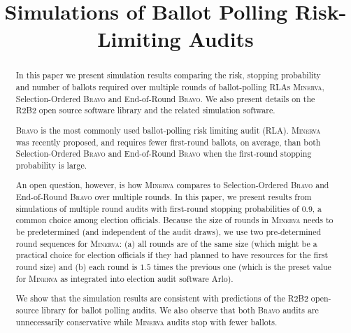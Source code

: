 \documentclass[runningheads]{llncs}
\newcommand{\Minerva}{\textsc{Minerva}\xspace}
\newcommand{\BRAVO}{\textsc{Bravo}\xspace}
\begin{document}
%
\title{Simulations of Ballot Polling Risk-Limiting Audits}
%
%

\maketitle              %
%
\begin{abstract}
    In this paper we present simulation results comparing the risk, stopping probability and number of ballots required over multiple rounds of ballot-polling RLAs \Minerva, Selection-Ordered \BRAVO and End-of-Round \BRAVO. We also
    present details on the R2B2 open source software library and the related simulation software.    
    
    \BRAVO is the most commonly used ballot-polling risk limiting audit (RLA). \Minerva was recently proposed, and requires fewer first-round ballots, on average, than both Selection-Ordered \BRAVO and End-of-Round \BRAVO when the first-round stopping probability is large. 
    
    An open question, however, is how \Minerva compares to Selection-Ordered \BRAVO and End-of-Round \BRAVO over multiple rounds.  In this paper, we present results from simulations of multiple round audits with first-round stopping probabilities of $0.9$, a common choice among election officials. Because the size of rounds in \Minerva needs to be predetermined (and independent of the audit draws), we use two pre-determined round sequences for \Minerva: (a) all rounds are of the same size (which might be a practical choice for election officials if they had planned to have resources for the first round size) and (b) each round is $1.5$ times the previous one (which is the preset value for \Minerva as integrated into election audit software Arlo). 
    
    We show that the simulation results are consistent with predictions of the R2B2 open-source library for ballot polling audits. We also observe that both \BRAVO audits are unnecessarily conservative 
    while \Minerva audits stop with fewer ballots. 

\end{abstract}
%
%
%
\end{document}
